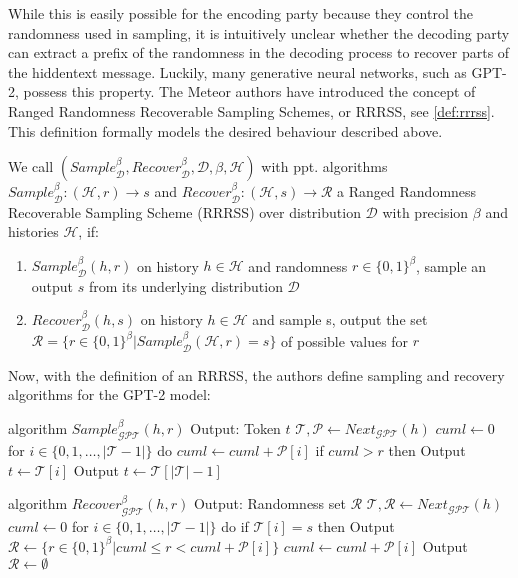 While this is easily possible for the encoding party because they control the randomness used in sampling, it is intuitively unclear whether the decoding party can extract a prefix of the randomness in the decoding process to recover parts of the hiddentext message.
Luckily, many generative neural networks, such as GPT-2, possess this property.
The Meteor authors have introduced the concept of Ranged Randomness Recoverable Sampling Schemes, or RRRSS, see \autoref{def:rrrss}.
This definition formally models the desired behaviour described above.

\begin{definition}
	\label{def:rrrss}
	We call 
	$(Sample_{\mathcal{D}}^\beta, Recover_{\mathcal{D}}^\beta, \mathcal{D}, \beta, \mathcal{H})$ 
	with ppt. algorithms
	$Sample_{\mathcal{D}}^\beta \colon (\mathcal{H}, r) \rightarrow s$ 
	and 
	$Recover_{\mathcal{D}}^\beta \colon (\mathcal{H}, s) \rightarrow \mathcal{R}$ 
	a Ranged Randomness Recoverable Sampling Scheme (RRRSS) over distribution $\mathcal{D}$ with precision $\beta$ and histories $\mathcal{H}$, if:
	
	\begin{enumerate}
		\item $Sample_{\mathcal{D}}^\beta(h, r)$ on history $h \in \mathcal{H}$ and randomness $r \in \{0,1\}^\beta$, sample an output $s$ from its underlying distribution $\mathcal{D}$
		\item $Recover_{\mathcal{D}}^\beta(h, s)$ on history $h \in \mathcal{H}$ and sample s, output the set $\mathcal{R} = \{ r \in \{0,1\}^\beta | Sample_{\mathcal{D}}^\beta(\mathcal{H}, r) = s \}$ of possible values for $r$
	\end{enumerate}
\end{definition}

Now, with the definition of an RRRSS, the authors define sampling and recovery algorithms for the GPT-2 model:

\begin{Pseudocode}[float]
algorithm $Sample_{\mathcal{GPT}}^\beta(	h, r)$
	Output: Token $t$
	$\mathcal{T}, \mathcal{P} \leftarrow Next_{\mathcal{GPT}}(h)$
	$cuml \leftarrow 0$
	for $i \in \{ 0, 1, \dots, | \mathcal{T} - 1 | \}$ do
		$cuml \leftarrow cuml + \mathcal{P}[i]$
		if $cuml > r$ then
			Output $t \leftarrow \mathcal{T}[i]$
	Output $t \leftarrow \mathcal{T}[|\mathcal{T}|-1]$
\end{Pseudocode}

\begin{Pseudocode}[float]
algorithm $Recover_{\mathcal{GPT}}^\beta(h, r)$
	Output: Randomness set $\mathcal{R}$
	$\mathcal{T}, \mathcal{R} \leftarrow Next_{\mathcal{GPT}}(h)$
	$cuml \leftarrow 0$
	for $i \in \{ 0, 1, \dots, | \mathcal{T} - 1 | \}$ do
		if $\mathcal{T}[i] = s$ then
			Output $\mathcal{R} \leftarrow \{ r \in \{ 0, 1\}^\beta | cuml \leq r < cuml + \mathcal{P}[i] \}$
		$cuml \leftarrow cuml + \mathcal{P}[i]$
	Output $\mathcal{R} \leftarrow \emptyset$
\end{Pseudocode}

